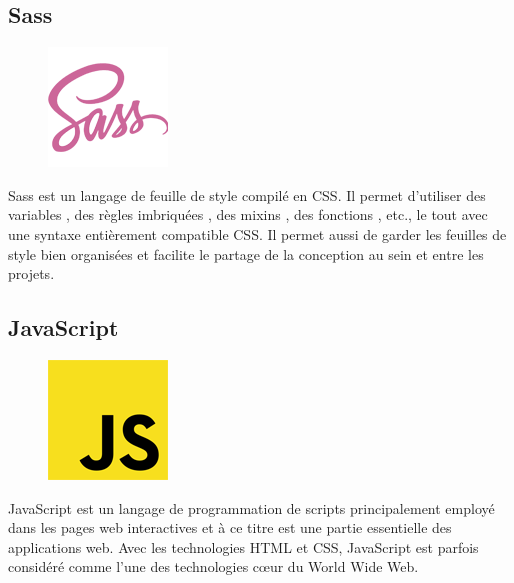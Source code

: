     \subsection{Sass}
            \begin{figure}
                \vspace{-22pt}
              \begin{center}
                 \includegraphics[scale=0.36]{images/logo/sass.png}
                 \label{fig72}
              \end{center}
              \vspace{-20pt}
              \vspace{-10pt}
            \end{figure}
        Sass est un langage de feuille de style compilé en CSS. Il permet d'utiliser des variables , des règles imbriquées , des mixins , des fonctions , etc., le tout avec une syntaxe entièrement compatible CSS. Il permet aussi de garder les feuilles de style bien organisées et facilite le partage de la conception au sein et entre les projets\cite{46}.
    \clearpage        
    
    \subsection{JavaScript}
            \begin{figure}
                \vspace{-22pt}
              \begin{center}
              \includegraphics[scale=0.36]{images/logo/js.png}
              \label{fig73}
              \end{center}
              \vspace{-20pt}
              \vspace{-10pt}
            \end{figure}
        JavaScript est un langage de programmation de scripts principalement employé dans les pages web interactives et à ce titre est une partie essentielle des applications web. Avec les technologies HTML et CSS, JavaScript est parfois considéré comme l'une des technologies cœur du World Wide Web\cite{16}.     
        
